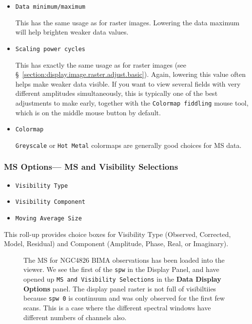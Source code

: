 \begin{itemize}

\item {\tt Data minimum/maximum}

This has the same usage as for raster images.  
Lowering the data maximum will help brighten
weaker data values.

\item {\tt Scaling power cycles}

This has exactly the same usage as for raster images (see
\S~\ref{section:display.image.raster.adjust.basic}).  Again, lowering
this value often helps make weaker data visible.  If you want to view
several fields with very different amplitudes simultaneously, this is
typically one of the best adjustments to make early, together with the
{\tt Colormap fiddling} mouse tool, which is on the middle mouse button
by default.

\item {\tt Colormap}

{\tt Greyscale} or {\tt Hot Metal} colormaps are generally good choices
for MS data.

\end{itemize}



\subsubsection{MS Options--- MS and Visibility Selections}
\label{section:display.ms.adjust.select}

\begin{itemize}

\item {\tt Visibility Type}

\item {\tt Visibility Component}

\item {\tt Moving Average Size}

\end{itemize}

This roll-up provides choice boxes for Visibility Type
(Observed, Corrected, Model, Residual) and Component (Amplitude,
Phase, Real, or Imaginary).  

\begin{figure}[h!]
\begin{center}
\caption{\label{fig:viewer_axes_1} The MS for NGC4826 BIMA
observations has been loaded into the viewer.  We see the
first of the {\tt spw} in the Display Panel, and have opened
up {\tt MS and Visibility Selections} in the
{\bf Data Display Options} panel.  The display panel raster is
not full of visibiltiies because {\tt spw 0} is continuum and
was only observed for the first few scans.  This is a case where
the different spectral windows have different numbers of channels
also.}
\hrulefill
\end{center}
\end{figure}

